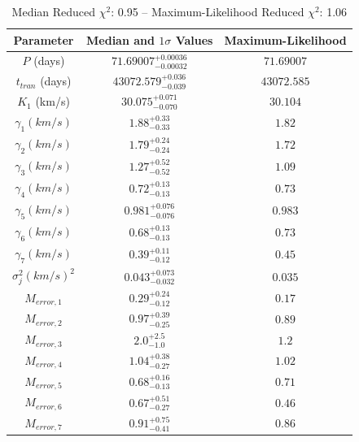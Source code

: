 \documentclass{article}
\begin{document}
\begin{table}
\centering
\caption{Median Reduced $\chi^2$: 0.95 -- Maximum-Likelihood Reduced $\chi^2$: 1.06}
\begin{tabular}{| c | c | c |}
\hline
Parameter & Median and $1 \sigma$ Values & Maximum-Likelihood \\
\hline
$P$ (days) & $71.69007^{+0.00036}_{-0.00032}$ & $71.69007$ \\
\hline
$t_{tran}$ (days) & $43072.579^{+0.036}_{-0.039}$ & $43072.585$ \\
\hline
$K_1$ (km/s) & $30.075^{+0.071}_{-0.070}$ & $30.104$ \\
\hline
$\gamma_{1} (km/s)$ & $1.88^{+0.33}_{-0.33}$ & $1.82$ \\
\hline
$\gamma_{2} (km/s)$ & $1.79^{+0.24}_{-0.24}$ & $1.72$ \\
\hline
$\gamma_{3} (km/s)$ & $1.27^{+0.52}_{-0.52}$ & $1.09$ \\
\hline
$\gamma_{4} (km/s)$ & $0.72^{+0.13}_{-0.13}$ & $0.73$ \\
\hline
$\gamma_{5} (km/s)$ & $0.981^{+0.076}_{-0.076}$ & $0.983$ \\
\hline
$\gamma_{6} (km/s)$ & $0.68^{+0.13}_{-0.13}$ & $0.73$ \\
\hline
$\gamma_{7} (km/s)$ & $0.39^{+0.11}_{-0.12}$ & $0.45$ \\
\hline
$\sigma^2_{j} (km/s)^2$ & $0.043^{+0.073}_{-0.032}$ & $0.035$ \\
\hline
$M_{error, 1} $ & $0.29^{+0.24}_{-0.12}$ & $0.17$ \\
\hline
$M_{error, 2} $ & $0.97^{+0.39}_{-0.25}$ & $0.89$ \\
\hline
$M_{error, 3} $ & $2.0^{+2.5}_{-1.0}$ & $1.2$ \\
\hline
$M_{error, 4} $ & $1.04^{+0.38}_{-0.27}$ & $1.02$ \\
\hline
$M_{error, 5} $ & $0.68^{+0.16}_{-0.13}$ & $0.71$ \\
\hline
$M_{error, 6} $ & $0.67^{+0.51}_{-0.27}$ & $0.46$ \\
\hline
$M_{error, 7} $ & $0.91^{+0.75}_{-0.41}$ & $0.86$ \\
\hline
\end{tabular}
\end{table}

\clearpage
\end{document}
